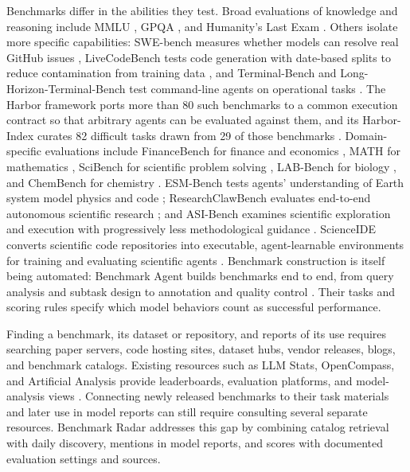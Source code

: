 \documentclass[11pt]{article}
\begin{document}
Benchmarks differ in the abilities they test. Broad evaluations of knowledge and reasoning include MMLU \citep{hendrycks2021mmlu}, GPQA \citep{rein2023gpqa}, and Humanity's Last Exam \citep{phan2025hle}. Others isolate more specific capabilities: SWE-bench measures whether models can resolve real GitHub issues \citep{jimenez2023swebench}, LiveCodeBench tests code generation with date-based splits to reduce contamination from training data \citep{jain2024livecodebench}, and Terminal-Bench and Long-Horizon-Terminal-Bench test command-line agents on operational tasks \citep{merrill2026terminalbench,li2026long}. The Harbor framework ports more than 80 such benchmarks to a common execution contract so that arbitrary agents can be evaluated against them, and its Harbor-Index curates 82 difficult tasks drawn from 29 of those benchmarks \citep{shi2026harbor,harborframework}. Domain-specific evaluations include FinanceBench for finance and economics \citep{islam2023financebench}, MATH for mathematics \citep{hendrycks2021math}, SciBench for scientific problem solving \citep{wang2023scibench}, LAB-Bench for biology \citep{laurent2024labbench}, and ChemBench for chemistry \citep{mirza2024chembench}. ESM-Bench tests agents' understanding of Earth system model physics and code \citep{wu2026esm}; ResearchClawBench evaluates end-to-end autonomous scientific research \citep{xu2026researchclawbench}; and ASI-Bench examines scientific exploration and execution with progressively less methodological guidance \citep{zhou2026asi}. ScienceIDE converts scientific code repositories into executable, agent-learnable environments for training and evaluating scientific agents \citep{geng2026scienceide}. Benchmark construction is itself being automated: Benchmark Agent builds benchmarks end to end, from query analysis and subtask design to annotation and quality control \citep{xiong2026benchmark}. Their tasks and scoring rules specify which model behaviors count as successful performance.

Finding a benchmark, its dataset or repository, and reports of its use requires searching paper servers, code hosting sites, dataset hubs, vendor releases, blogs, and benchmark catalogs. Existing resources such as LLM Stats, OpenCompass, and Artificial Analysis provide leaderboards, evaluation platforms, and model-analysis views \citep{llmstats2026benchmarks,opencompass2026datasetstatistics,artificialanalysis2026methodology}. Connecting newly released benchmarks to their task materials and later use in model reports can still require consulting several separate resources. Benchmark Radar addresses this gap by combining catalog retrieval with daily discovery, mentions in model reports, and scores with documented evaluation settings and sources.
\end{document}
